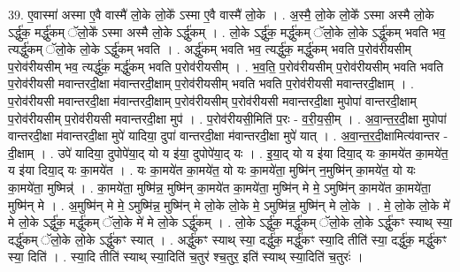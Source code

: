 \documentclass[17pt]{extarticle}
\begin{document}
39. ए॒वास्मा॑ अस्मा ए॒वै वास्मै॑ लो॒के लो॒के᳚ ऽस्मा ए॒वै वास्मै॑ लो॒के । . अ॒स्मै॒ लो॒के लो॒के᳚ ऽस्मा अस्मै लो॒के ऽर्द्धु॑क॒ मर्द्धु॑कम् ॅलो॒के᳚ ऽस्मा अस्मै लो॒के ऽर्द्धु॑कम् । . लो॒के ऽर्द्धु॑क॒ मर्द्धु॑कम् ॅलो॒के लो॒के ऽर्द्धु॑कम् भवति भव॒ त्यर्द्धु॑कम् ॅलो॒के लो॒के ऽर्द्धु॑कम् भवति । . अर्द्धु॑कम् भवति भव॒ त्यर्द्धु॑क॒ मर्द्धु॑कम् भवति प॒रोव॑रीयसीम् प॒रोव॑रीयसीम् भव॒ त्यर्द्धु॑क॒ मर्द्धु॑कम् भवति प॒रोव॑रीयसीम् । . भ॒व॒ति॒ प॒रोव॑रीयसीम् प॒रोव॑रीयसीम् भवति भवति प॒रोव॑रीयसी मवान्तरदी॒क्षा म॑वान्तरदी॒क्षाम् प॒रोव॑रीयसीम् भवति भवति प॒रोव॑रीयसी मवान्तरदी॒क्षाम् । . प॒रोव॑रीयसी मवान्तरदी॒क्षा म॑वान्तरदी॒क्षाम् प॒रोव॑रीयसीम् प॒रोव॑रीयसी मवान्तरदी॒क्षा मुपोपा॑ वान्तरदी॒क्षाम् प॒रोव॑रीयसीम् प॒रोव॑रीयसी मवान्तरदी॒क्षा मुप॑ । . प॒रोव॑रीयसी॒मिति॑ प॒रः - व॒री॒य॒सी॒म् । . अ॒वा॒न्त॒र॒दी॒क्षा मुपोपा॑ वान्तरदी॒क्षा म॑वान्तरदी॒क्षा मुपे॑ यादिया॒ दुपा॑ वान्तरदी॒क्षा म॑वान्तरदी॒क्षा मुपे॑ यात् । . अ॒वा॒न्त॒र॒दी॒क्षामित्य॑वान्तर - दी॒क्षाम् । . उपे॑ यादिया॒ दुपोपे॑या॒द् यो य इ॑या॒ दुपोपे॑या॒द् यः । . इ॒या॒द् यो य इ॑या दिया॒द् यः का॒मये॑त का॒मये॑त॒ य इ॑या दिया॒द् यः का॒मये॑त । . यः का॒मये॑त का॒मये॑त॒ यो यः का॒मये॑ता॒ मुष्मि॑न् न॒मुष्मि॑न् का॒मये॑त॒ यो यः का॒मये॑ता॒ मुष्मिन्न्॑ । . का॒मये॑ता॒ मुष्मि॑न्न॒ मुष्मि॑न् का॒मये॑त का॒मये॑ता॒ मुष्मि॑न् मे मे॒ ऽमुष्मि॑न् का॒मये॑त का॒मये॑ता॒ मुष्मि॑न् मे । . अ॒मुष्मि॑न् मे मे॒ ऽमुष्मि॑न्न॒ मुष्मि॑न् मे लो॒के लो॒के मे॒ ऽमुष्मि॑न्न॒ मुष्मि॑न् मे लो॒के । . मे॒ लो॒के लो॒के मे॑ मे लो॒के ऽर्द्धु॑क॒ मर्द्धु॑कम् ॅलो॒के मे॑ मे लो॒के ऽर्द्धु॑कम् । . लो॒के ऽर्द्धु॑क॒ मर्द्धु॑कम् ॅलो॒के लो॒के ऽर्द्धु॑कꣳ स्याथ् स्या॒ दर्द्धु॑कम् ॅलो॒के लो॒के ऽर्द्धु॑कꣳ स्यात् । . अर्द्धु॑कꣳ स्याथ् स्या॒ दर्द्धु॑क॒ मर्द्धु॑कꣳ स्या॒दि तीति॑ स्या॒ दर्द्धु॑क॒ मर्द्धु॑कꣳ स्या॒ दिति॑ । . स्या॒दि तीति॑ स्याथ् स्या॒दिति॑ च॒तुर॑ श्च॒तुर॒ इति॑ स्याथ् स्या॒दिति॑ च॒तुरः॑ । \newline
\end{document}
